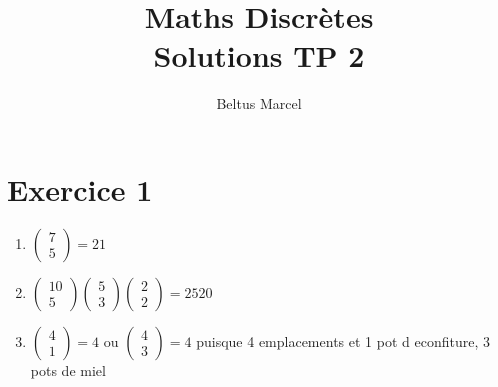 \documentclass[fontsize=10pt]{article}
\title{\textbf{Maths Discrètes }\\Solutions TP 2 }
\author{Beltus Marcel}
\date{}
\begin{document}
\maketitle %


\section*{Exercice 1}
\begin{enumerate}
\item $\begin{pmatrix}
7 \\ 5
\end{pmatrix} = 21$
\item $\begin{pmatrix} 
10\\
5
\end{pmatrix}
\begin{pmatrix} 
5\\
3
\end{pmatrix}
\begin{pmatrix} 
2\\
2
\end{pmatrix} = 2520$
\item $ 
\begin{pmatrix} 
4\\
1
\end{pmatrix} = 4$ ou $
\begin{pmatrix} 
4\\
3
\end{pmatrix} =4$ puisque 4 emplacements et 1 pot d econfiture, 3 pots de miel
\end{enumerate}
\end{document}
